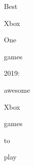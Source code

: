\documentclass[varwidth]{standalone}
\begin{document}
\begin{CJK*}{UTF8}{gbsn}
{\setlength{\fboxsep}{0pt}\colorbox{white!0}{\parbox{0.9\textwidth}{
\colorbox{red!0.0}{\strut Best} \colorbox{red!99.91796102620793}{\strut Xbox} \colorbox{red!56.532611525029694}{\strut One} \colorbox{red!71.97044576957562}{\strut games} \colorbox{red!100.0}{\strut 2019:} \colorbox{red!78.76700977351825}{\strut awesome} \colorbox{red!66.29749893606423}{\strut Xbox} \colorbox{red!56.12925706294965}{\strut games} \colorbox{red!22.63527363693416}{\strut to} \colorbox{red!35.618733165827535}{\strut play} 
}}}
\end{CJK*}
\end{document}
